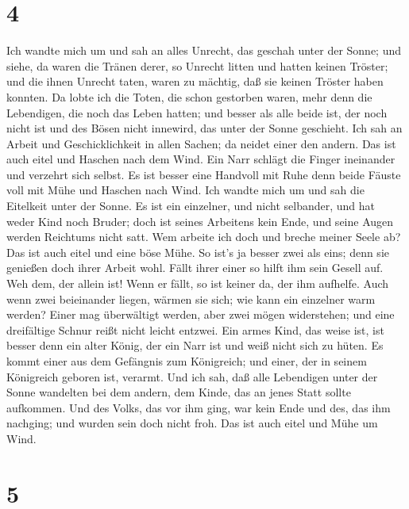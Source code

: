 \hypertarget{section-3}{%
\section{4}\label{section-3}}

 Ich wandte mich um und sah an alles Unrecht, das geschah
unter der Sonne; und siehe, da waren die Tränen derer, so Unrecht litten
und hatten keinen Tröster; und die ihnen Unrecht taten, waren zu
mächtig, daß sie keinen Tröster haben konnten.  Da lobte ich
die Toten, die schon gestorben waren, mehr denn die Lebendigen, die noch
das Leben hatten;  und besser als alle beide ist, der noch
nicht ist und des Bösen nicht innewird, das unter der Sonne geschieht.
 Ich sah an Arbeit und Geschicklichkeit in allen Sachen; da
neidet einer den andern. Das ist auch eitel und Haschen nach dem Wind.
 Ein Narr schlägt die Finger ineinander und verzehrt sich
selbst.  Es ist besser eine Handvoll mit Ruhe denn beide
Fäuste voll mit Mühe und Haschen nach Wind.  Ich wandte mich
um und sah die Eitelkeit unter der Sonne.  Es ist ein
einzelner, und nicht selbander, und hat weder Kind noch Bruder; doch ist
seines Arbeitens kein Ende, und seine Augen werden Reichtums nicht satt.
Wem arbeite ich doch und breche meiner Seele ab? Das ist auch eitel und
eine böse Mühe.  So ist's ja besser zwei als eins; denn sie
genießen doch ihrer Arbeit wohl.  Fällt ihrer einer so
hilft ihm sein Gesell auf. Weh dem, der allein ist! Wenn er fällt, so
ist keiner da, der ihm aufhelfe.  Auch wenn zwei
beieinander liegen, wärmen sie sich; wie kann ein einzelner warm werden?
 Einer mag überwältigt werden, aber zwei mögen widerstehen;
und eine dreifältige Schnur reißt nicht leicht entzwei. 
Ein armes Kind, das weise ist, ist besser denn ein alter König, der ein
Narr ist und weiß nicht sich zu hüten.  Es kommt einer aus
dem Gefängnis zum Königreich; und einer, der in seinem Königreich
geboren ist, verarmt.  Und ich sah, daß alle Lebendigen
unter der Sonne wandelten bei dem andern, dem Kinde, das an jenes Statt
sollte aufkommen.  Und des Volks, das vor ihm ging, war
kein Ende und des, das ihm nachging; und wurden sein doch nicht froh.
Das ist auch eitel und Mühe um Wind.

\hypertarget{section-4}{%
\section{5}\label{section-4}}

